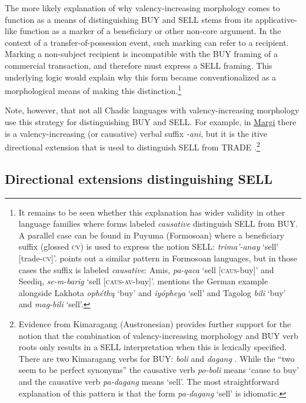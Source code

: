 The more likely explanation of why valency-increasing morphology comes to function as a means of distinguishing BUY and SELL stems from its applicative-like function as a marker of a beneficiary or other non-core argument. In the context of a transfer-of-possession event, such marking can refer to a recipient. Marking a non-subject recipient is incompatible with the BUY framing of a commercial transaction, and therefore must express a SELL framing. This underlying logic would explain why this form became conventionalized as a morphological means of making this distinction.\footnote{It remains to be seen whether this explanation has wider validity in other language families where forms labeled \textit{causative} distinguish SELL from BUY. A parallel case can be found in Puyuma (Formosoan) where a beneficiary suffix (glossed \textsc{cv}) is used to express the notion SELL: \textit{trima'-anay} `sell' [trade-\textsc{cv}]'. \citet[156]{kuoArgumentAlternationArgument2015} points out a similar pattern in Formosoan languages, but in those cases the suffix is labeled \textit{causative}: Amis, \textit{pa-qaca} `sell [\textsc{caus}-buy]' and Seediq, \textit{se-m-barig} `sell [\textsc{caus-av}-buy]'. \citet[387]{van1999generalized} mentions the German example alongside Lakhota \textit{ophéthų} `buy' and \textit{iyópheya} `sell' and Tagolog \textit{bili} `buy' and \textit{mag-bili} `sell'.}

Note, however, that not all Chadic languages with valency-increasing morphology use this strategy for distinguishing BUY and SELL. For example, in \hyperref[marg]{Margi} there is a valency-increasing (or causative) verbal suffix \textit{-ani}, but it is the itive directional extension that is used to distinguish SELL from TRADE \citep[119]{hoffmannGrammarMargiLanguage1963}.\footnote{Evidence from Kimaragang (Austronesian) provides further support for the notion that the combination of valency-increasing morphology and BUY verb roots only results in a SELL interpretation when this is lexically specified. There are two Kimaragang verbs for BUY: \textit{boli} and \textit{dagang} \citet[270]{kroegerCaseMarkingKimaragang1988}. While the ``two seem to be perfect synonyms'' the causative verb \textit{po-boli} means `cause to buy' and the causative verb \textit{pa-dagang} means `sell'. The most straightforward explanation of this pattern is that the form \textit{pa-dagang} `sell' is idiomatic.}  

\subsection{Directional extensions distinguishing SELL}	

